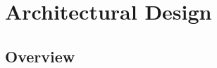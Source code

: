 \clearpage
\section{Architectural Design}
\subsection{Overview}

\clearpage

\clearpage

\clearpage

\clearpage

\clearpage

\clearpage
